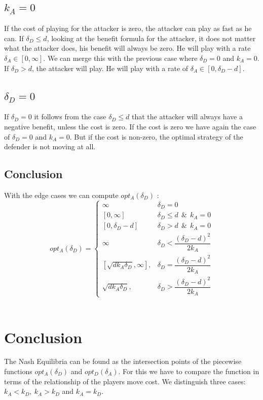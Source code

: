 \subsection*{$k_{A}=0$}
If the cost of playing for the attacker is zero, the attacker can play as fast as he can.  If $\delta_{D} \leq d$, looking at the benefit formula for the attacker, it does not matter what the attacker does, his benefit will always be zero. He will play with a rate $\delta_{A} \in [0,\infty ]$.  We can merge this with the previous case where $\delta_{D}=0$ and $k_{A}=0$.  If $\delta_{D} > d$, the attacker will play. He will play with a rate of $\delta_{A} \in [0, \delta_{D} - d ]$. 
\subsection*{$\delta_{D}=0$}
If $\delta_{D}=0$ it follows from the case $\delta_{D} \leq d$ that the attacker will always have a negative benefit, unless the cost is zero. If the cost is zero we have again the case of $\delta_{D}=0$ and $k_{A}=0$. But if the cost is non-zero, the optimal strategy of the defender is not moving at all. 

\subsection{Conclusion}
With the edge cases we can compute $opt_{A}(\delta_{D})$ : \\

 \begin{displaymath}
  opt_{A}(\delta_{D}) = \left\{
     \begin{array}{lr}
     \infty & \delta_{D} = 0 \\
     \left[0,\infty\right] & \delta_{D} \leq d ~~\& ~~k_{A}=0 \\
          \left[0,\delta_{D} - d\right] & \delta_{D} > d ~~\& ~~k_{A}=0 \\
                 \infty & \delta_{D} < \dfrac{(\delta_{D}-d)^{2}}{2k_{A}} \\
       \left[ \sqrt{d k_{A}\delta_{D}}, \infty\right],  & \delta_{D} = \dfrac{(\delta_{D}-d)^{2}}{2k_{A}} \\
       \sqrt{d k_{A}\delta_{D}}, & \delta_{D} > \dfrac{(\delta_{D}-d)^{2}}{2k_{A}}
     \end{array}
   \right.
\end{displaymath}
\\

\section{Conclusion}
The Nash Equilibria can be found as the intersection points of the piecewise functions $opt_{A}(\delta_{D})$ and $opt_{D}(\delta_{A})$. For this we have to compare the function in terms of the relationship of the players move cost. We distinguish three cases: $k_{A} < k_{D} , ~k_{A} > k_{D} $ and $k_{A} = k_{D}$. 
